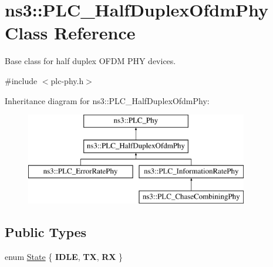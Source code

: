 \hypertarget{classns3_1_1PLC__HalfDuplexOfdmPhy}{\section{ns3\-:\-:\-P\-L\-C\-\_\-\-Half\-Duplex\-Ofdm\-Phy \-Class \-Reference}
\label{classns3_1_1PLC__HalfDuplexOfdmPhy}
}


\-Base class for half duplex \-O\-F\-D\-M \-P\-H\-Y devices.  




{\ttfamily \#include $<$plc-\/phy.\-h$>$}

\-Inheritance diagram for ns3\-:\-:\-P\-L\-C\-\_\-\-Half\-Duplex\-Ofdm\-Phy\-:\begin{figure}[H]
\begin{center}
\leavevmode
\includegraphics[height=4.000000cm]{classns3_1_1PLC__HalfDuplexOfdmPhy}
\end{center}
\end{figure}
\subsection*{\-Public \-Types}
\begin{DoxyCompactItemize}
\item 
enum \hyperlink{classns3_1_1PLC__HalfDuplexOfdmPhy_ae91e168f9a51bf5344e7e03d9ae13b60}{\-State} \{ {\bfseries \-I\-D\-L\-E}, 
{\bfseries \-T\-X}, 
{\bfseries \-R\-X}
 \}
\end{DoxyCompactItemize}
